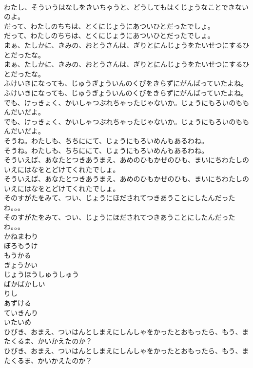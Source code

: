 \documentclass[8pt]{extreport}
\begin{document}
\begin{CJK}{UTF8}{min}
\\	わたし、そういうはなしをきいちゃうと、どうしてもはくじょうなことできないのよ。
\\	だって、わたしのちちは、とくにじょうにあついひとだったでしょ。
\\	だって、わたしのちちは、とくにじょうにあついひとだったでしょ。
\\	まぁ、たしかに、きみの、おとうさんは、ぎりとにんじょうをたいせつにするひとだったな。
\\	まぁ、たしかに、きみの、おとうさんは、ぎりとにんじょうをたいせつにするひとだったな。
\\	ふけいきになっても、じゅうぎょういんのくびをきらずにがんばっていたよね。
\\	ふけいきになっても、じゅうぎょういんのくびをきらずにがんばっていたよね。
\\	でも、けっきょく、かいしゃつぶれちゃったじゃないか。じょうにもろいのももんだいだよ。
\\	でも、けっきょく、かいしゃつぶれちゃったじゃないか。じょうにもろいのももんだいだよ。
\\	そうね。わたしも、ちちににて、じょうにもろいめんもあるわね。
\\	そうね。わたしも、ちちににて、じょうにもろいめんもあるわね。
\\	そういえば、あなたとつきあうまえ、あめのひもかぜのひも、まいにちわたしのいえにはなをとどけてくれたでしょ。
\\	そういえば、あなたとつきあうまえ、あめのひもかぜのひも、まいにちわたしのいえにはなをとどけてくれたでしょ。
\\	そのすがたをみて、つい、じょうにほだされてつきあうことにしたんだったわ。。。
\\	そのすがたをみて、つい、じょうにほだされてつきあうことにしたんだったわ。。。
\\	かねまわり
\\	ぼろもうけ
\\	もうかる
\\	ぎょうかい
\\	じょうほうしゅうしゅう
\\	ばかばかしい
\\	りし
\\	あずける
\\	ていきんり
\\	いたいめ
\\	ひびき、おまえ、ついはんとしまえにしんしゃをかったとおもったら、もう、またくるま、かいかえたのか？
\\	ひびき、おまえ、ついはんとしまえにしんしゃをかったとおもったら、もう、またくるま、かいかえたのか？

\end{CJK}
\end{document}
